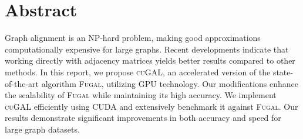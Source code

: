 \section*{Abstract}
Graph alignment is an NP-hard problem, making good approximations computationally expensive for large graphs. Recent developments indicate that working directly with adjacency matrices yields better results compared to other methods. In this report, we propose \textsc{cuGAL}, an accelerated version of the state-of-the-art algorithm \textsc{Fugal}, utilizing GPU technology. Our modifications enhance the scalability of \textsc{Fugal} while maintaining its high accuracy. We implement \textsc{cuGAL} efficiently using CUDA and extensively benchmark it against \textsc{Fugal}. Our results demonstrate significant improvements in both accuracy and speed for large graph datasets.